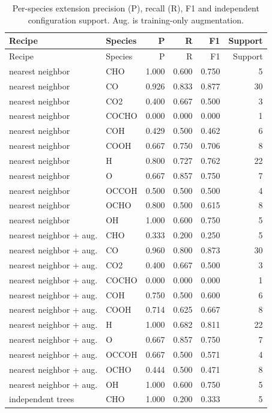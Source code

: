 \small\begin{longtable}{llrrrr}
\caption{Per-species extension precision (P), recall (R), F1 and independent configuration support. Aug. is training-only augmentation.}\\
\toprule Recipe & Species & P & R & F1 & Support\\\midrule\endfirsthead
\toprule Recipe & Species & P & R & F1 & Support\\\midrule\endhead
nearest neighbor & CHO & 1.000 & 0.600 & 0.750 & 5\\
nearest neighbor & CO & 0.926 & 0.833 & 0.877 & 30\\
nearest neighbor & CO2 & 0.400 & 0.667 & 0.500 & 3\\
nearest neighbor & COCHO & 0.000 & 0.000 & 0.000 & 1\\
nearest neighbor & COH & 0.429 & 0.500 & 0.462 & 6\\
nearest neighbor & COOH & 0.667 & 0.750 & 0.706 & 8\\
nearest neighbor & H & 0.800 & 0.727 & 0.762 & 22\\
nearest neighbor & O & 0.667 & 0.857 & 0.750 & 7\\
nearest neighbor & OCCOH & 0.500 & 0.500 & 0.500 & 4\\
nearest neighbor & OCHO & 0.800 & 0.500 & 0.615 & 8\\
nearest neighbor & OH & 1.000 & 0.600 & 0.750 & 5\\
nearest neighbor + aug. & CHO & 0.333 & 0.200 & 0.250 & 5\\
nearest neighbor + aug. & CO & 0.960 & 0.800 & 0.873 & 30\\
nearest neighbor + aug. & CO2 & 0.400 & 0.667 & 0.500 & 3\\
nearest neighbor + aug. & COCHO & 0.000 & 0.000 & 0.000 & 1\\
nearest neighbor + aug. & COH & 0.750 & 0.500 & 0.600 & 6\\
nearest neighbor + aug. & COOH & 0.714 & 0.625 & 0.667 & 8\\
nearest neighbor + aug. & H & 1.000 & 0.682 & 0.811 & 22\\
nearest neighbor + aug. & O & 0.667 & 0.857 & 0.750 & 7\\
nearest neighbor + aug. & OCCOH & 0.667 & 0.500 & 0.571 & 4\\
nearest neighbor + aug. & OCHO & 0.444 & 0.500 & 0.471 & 8\\
nearest neighbor + aug. & OH & 1.000 & 0.600 & 0.750 & 5\\
independent trees & CHO & 1.000 & 0.200 & 0.333 & 5\\

\end{longtable}
